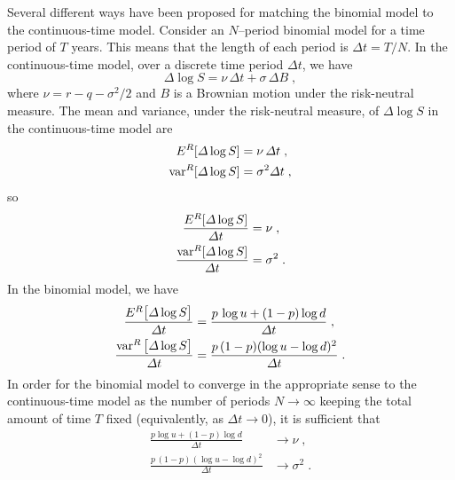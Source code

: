 Several different ways have been proposed for matching the binomial model to the continuous-time model.  Consider an $N$--period binomial model for a time period of $T$ years.  This means that the length of each period is $\varDelta t = T/N$.  In the continuous-time model, over a discrete time period $\varDelta t$, we have
$$\varDelta \log S =\nu\,\varDelta t + \sigma\,\varDelta B\; ,$$
where $\nu = r-q-\sigma^2/2$ and $B$ is a Brownian motion under the risk-neutral measure.  The mean and variance, under the risk-neutral measure, of $\varDelta \log S$ in the continuous-time model are
\begin{align*}
E^R[\varDelta \log S] &= \nu\,\varDelta t\; ,\\
\operatorname{var}^R[\varDelta \log S]&=\sigma^2\varDelta t\; ,
\end{align*}
so 
\begin{align*}
\frac{E^R[\varDelta \log S]}{\varDelta t} &= \nu\; ,\\
\frac{\operatorname{var}^R[\varDelta \log S]}{\varDelta t}&=\sigma^2\;.
\end{align*}
In the binomial model, we have
\begin{align*}
\frac{E^R\big[\varDelta \log S\big]}{\varDelta t} &=\frac{p\,\log u+(1-p)\log d}{\varDelta t}\; ,\\
\frac{\operatorname{var}^R\big[\varDelta \log S\big] }{\varDelta t}&=\frac{p\,(1-p)(\log u-\log d)^2}{\varDelta t}\;.
\end{align*}
In order for the binomial model to converge in the appropriate sense to the continuous-time model as the number of periods $N \rightarrow \infty$ keeping the total amount of time $T$ fixed (equivalently, as $\varDelta t \rightarrow 0$), it is sufficient that
\begin{align*}
\frac{p\log u+(1-p)\log d}{\varDelta t} &\rightarrow \nu\; ,\\
\frac{p\,(1-p)(\log u-\log d)^2}{\varDelta t} &\rightarrow \sigma^2\;.
\end{align*}


